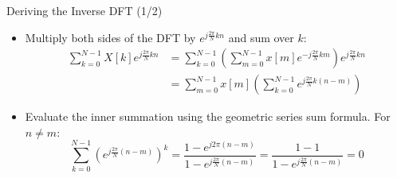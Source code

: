 \begin{frame}{Deriving the Inverse DFT (1/2)}
  \begin{itemize}
    \item Multiply both sides of the DFT by $e^{j\frac{2\pi}{N}kn}$ and sum over $k$:
      \begin{align*}
        \sum_{k=0}^{N-1} X[k] e^{j\frac{2\pi}{N}kn} & = \sum_{k=0}^{N-1} \left( \sum_{m=0}^{N-1} x[m] e^{-j\frac{2\pi}{N}km} \right) e^{j\frac{2\pi}{N}kn} \\
        & = \sum_{m=0}^{N-1} x[m] \left( \sum_{k=0}^{N-1} e^{j\frac{2\pi}{N}k(n-m)} \right)
      \end{align*}
    \item Evaluate the inner summation using the geometric series sum formula. For $n \neq m$:
      \begin{equation*}
        \sum_{k=0}^{N-1} \left( e^{j\frac{2\pi}{N}(n-m)} \right)^k = \frac{1 - e^{j2\pi(n-m)}}{1 - e^{j\frac{2\pi}{N}(n-m)}} = \frac{1 - 1}{1 - e^{j\frac{2\pi}{N}(n-m)}} = 0
      \end{equation*}
  \end{itemize}
\end{frame}

